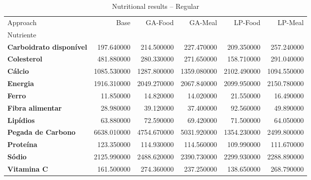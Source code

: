 \begin{table}
\caption{Nutritional results -- Regular}
\label{tab:regular}
\begin{tabular}{lrrrrr}
\toprule
Approach & Base & GA-Food & GA-Meal & LP-Food & LP-Meal \\
Nutriente &  &  &  &  &  \\
\midrule
\textbf{Carboidrato disponível} & 197.640000 & 214.500000 & 227.470000 & 209.350000 & 257.240000 \\
\textbf{Colesterol} & 481.880000 & 280.330000 & 271.650000 & 158.710000 & 291.040000 \\
\textbf{Cálcio} & 1085.530000 & 1287.800000 & 1359.080000 & 2102.490000 & 1094.550000 \\
\textbf{Energia} & 1916.310000 & 2049.270000 & 2067.840000 & 2099.950000 & 2150.780000 \\
\textbf{Ferro} & 11.850000 & 14.820000 & 14.020000 & 21.550000 & 16.490000 \\
\textbf{Fibra alimentar} & 28.980000 & 39.120000 & 37.400000 & 92.560000 & 49.890000 \\
\textbf{Lipídios} & 63.880000 & 72.590000 & 69.420000 & 71.500000 & 64.050000 \\
\textbf{Pegada de Carbono} & 6638.010000 & 4754.670000 & 5031.920000 & 1354.230000 & 2499.800000 \\
\textbf{Proteína} & 123.350000 & 114.930000 & 114.560000 & 109.990000 & 111.670000 \\
\textbf{Sódio} & 2125.990000 & 2488.620000 & 2390.730000 & 2299.930000 & 2288.890000 \\
\textbf{Vitamina C} & 161.500000 & 274.360000 & 237.250000 & 138.650000 & 268.790000 \\
\bottomrule
\end{tabular}
\end{table}

